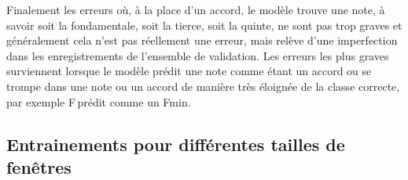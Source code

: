 Finalement les erreurs où, à la place d'un accord, le modèle trouve une note, à savoir soit la fondamentale, soit la tierce, soit la quinte, ne sont pas trop graves et généralement cela n'est pas réellement une erreur, mais relève d'une imperfection dans les enregistrements de l'ensemble de validation. Les erreurs les plus graves surviennent lorsque le modèle prédit une note comme étant un accord ou se trompe dans une note ou un accord de manière très éloignée de la classe correcte, par exemple F\sh\,prédit comme un F\sh min.

\subsection{Entrainements pour différentes tailles de fenêtres}

\begin{table}[H]
\end{table}

